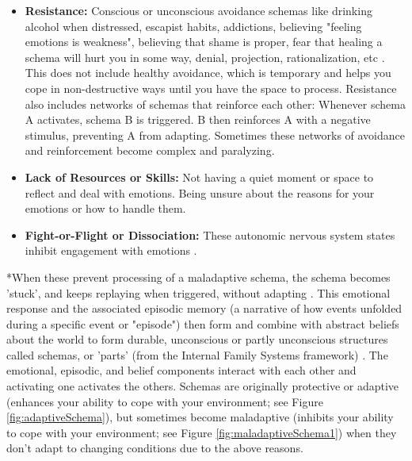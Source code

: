 \documentclass[12pt,letterpaper]{article}
\begin{document}
\begin{itemize}
    \item \textbf{Resistance:} Conscious or unconscious avoidance schemas like drinking alcohol when distressed, escapist habits, addictions, believing "feeling emotions is weakness", believing that shame is proper, fear that healing a schema will hurt you in some way, denial, projection, rationalization, etc \cite{eckerUnlocking}. This does not include healthy avoidance, which is temporary and helps you cope in non-destructive ways until you have the space to process. Resistance also includes networks of schemas that reinforce each other: Whenever schema A activates, schema B is triggered. B then reinforces A with a negative stimulus, preventing A from adapting. Sometimes these networks of avoidance and reinforcement become complex and paralyzing. 
    \item \textbf{Lack of Resources or Skills:} Not having a quiet moment or space to reflect and deal with emotions. Being unsure about the reasons for your emotions or how to handle them. 
    \item \textbf{Fight-or-Flight or Dissociation:} These autonomic nervous system states inhibit engagement with emotions \cite{razviPSIP}.
\end{itemize}
\label{def:schemas}
*When these prevent processing of a maladaptive schema, the schema becomes 'stuck', and keeps replaying when triggered, without adapting \cite{rachmanProcessing,eckerUnlocking}. This emotional response and the associated episodic memory (a narrative of how events unfolded during a specific event or "episode") then form and combine with abstract beliefs about the world to form durable, unconscious or partly unconscious structures called schemas, or 'parts' (from the Internal Family Systems framework) \cite{laneReconsolidation,lesswrongCoherenceTherapy}. The emotional, episodic, and belief components interact with each other and activating one activates the others. Schemas are originally protective or adaptive (enhances your ability to cope with your environment; see Figure \ref{fig:adaptiveSchema}), but sometimes become maladaptive (inhibits your ability to cope with your environment; see Figure \ref{fig:maladaptiveSchema1}) when they don't adapt to changing conditions due to the above reasons.
\end{document}
